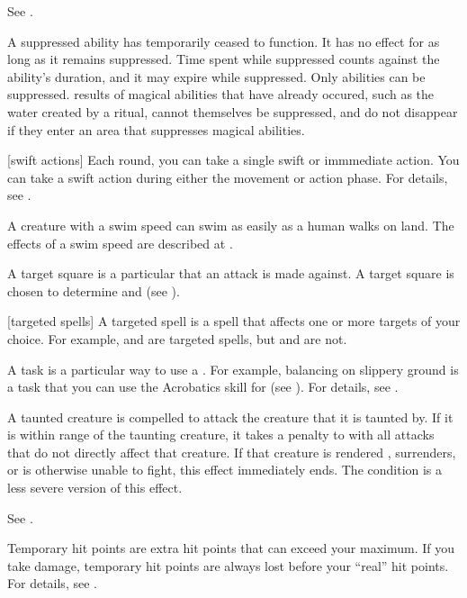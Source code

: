  See .

 A suppressed ability has temporarily ceased to function.
It has no effect for as long as it remains suppressed.
Time spent while suppressed counts against the ability's duration, and it may expire while suppressed.
Only  abilities can be suppressed.
 results of magical abilities that have already occured, such as the water created by a  ritual, cannot themselves be suppressed, and do not disappear if they enter an area that suppresses magical abilities.

[swift actions] Each round, you can take a single swift or immmediate action.
You can take a swift action during either the movement or action phase.
For details, see .

 A creature with a swim speed can swim as easily as a human walks on land.
The effects of a swim speed are described at .

 A target square is a particular  that an attack is made against.
A target square is chosen to determine  and  (see ).

[targeted spells] A targeted spell is a spell that affects one or more targets of your choice.
For example,  and  are targeted spells, but  and  are not.

 A task is a particular way to use a .
For example, balancing on slippery ground is a task that you can use the Acrobatics skill for (see ).
For details, see .

 A taunted creature is compelled to attack the creature that it is taunted by.
If it is within \rngmed range of the taunting creature, it takes a  penalty to  with all attacks that do not directly affect that creature.
If that creature is rendered \helpless, surrenders, or is otherwise unable to fight, this effect immediately ends.
The  condition is a less severe version of this effect.

 See .

 Temporary hit points are extra hit points that can exceed your maximum.
If you take damage, temporary hit points are always lost before your ``real'' hit points.
For details, see .

